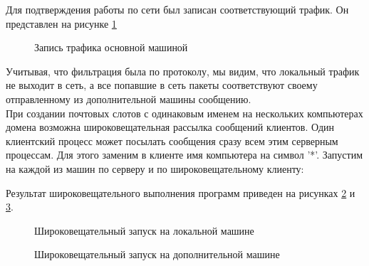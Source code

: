 \documentclass[a4paper]{article}
\begin{document}
	Для подтверждения работы по сети был записан соответствующий трафик. Он представлен на рисунке \ref{img:task9_wire}
	
	\begin{figure}[h!]
		\caption{Запись трафика основной машиной}
		\label{img:task9_wire}
	\end{figure}
	
	Учитывая, что фильтрация была по протоколу, мы видим, что локальный трафик не выходит в сеть, а все попавшие в сеть пакеты соответствуют своему отправленному из дополнительной машины сообщению.\\
	
	При создании почтовых слотов с одинаковым именем на нескольких компьютерах домена возможна широковещательная рассылка сообщений клиентов. Один клиентский процесс может посылать сообщения сразу всем этим серверным процессам. Для этого заменим в клиенте имя компьютера на символ '*'. Запустим на каждой из машин по серверу и по широковещательному клиенту:
	
		Результат широковещательного выполнения программ приведен на рисунках \ref{img:task9_broad_local} и \ref{img:task9_broad_remote}.
	\begin{figure}[h!]
		\caption{Широковещательный запуск на локальной машине}
		\label{img:task9_broad_local}
	\end{figure}

	\begin{figure}[h!]
		\caption{Широковещательный запуск на дополнительной машине}
		\label{img:task9_broad_remote}
	\end{figure}
	
\end{document}
